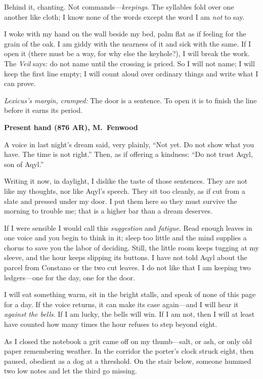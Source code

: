 \documentclass[11pt]{article}
\begin{document}
Behind it, chanting. Not commands—\emph{keepings}. The syllables fold over one another like cloth; I know none of the words except the word I am \emph{not} to say.

I woke with my hand on the wall beside my bed, palm flat as if feeling for the grain of the oak. I am giddy with the nearness of it and sick with the same. If I open it (there must be a way, for why else the keyhole?), I will break the work. The \textit{Veil} says: do not name until the crossing is priced. So I will not name; I will keep the first line empty; I will count aloud over ordinary things and write what I can prove.

\medskip
\noindent\textit{Lexicus’s margin, cramped:} The door is a sentence. To open it is to finish the line before it earns its period.

\medskip
\noindent\textbf{Present hand (876 AR), M.\ Fenwood}

A voice in last night’s dream said, very plainly, “Not yet. Do not show what you have. The time is not right.” Then, as if offering a kindness: “Do not trust Aqyl, son of Aqyl.”

Writing it now, in daylight, I dislike the taste of those sentences. They are not like my thoughts, nor like Aqyl’s speech. They sit too cleanly, as if cut from a slate and pressed under my door. I put them here so they must survive the morning to trouble me; that is a higher bar than a dream deserves.

If I were sensible I would call this \emph{suggestion} and \emph{fatigue}. Read enough leaves in one voice and you begin to think in it; sleep too little and the mind supplies a chorus to save you the labor of deciding. Still, the little room keeps tugging at my sleeve, and the hour keeps slipping its buttons. I have not told Aqyl about the parcel from Constano or the two cut leaves. I do not like that I am keeping two ledgers—one for the day, one for the door.

I will eat something warm, sit in the bright stalls, and speak of none of this page for a day. If the voice returns, it can make its case again—and I will hear it \emph{against the bells}. If I am lucky, the bells will win. If I am not, then I will at least have counted how many times the hour refuses to step beyond eight.

As I closed the notebook a grit came off on my thumb—salt, or ash, or only old paper remembering weather. In the corridor the porter’s clock struck eight, then paused, obedient as a dog at a threshold. On the stair below, someone hummed two low notes and let the third go missing.
\end{document}
